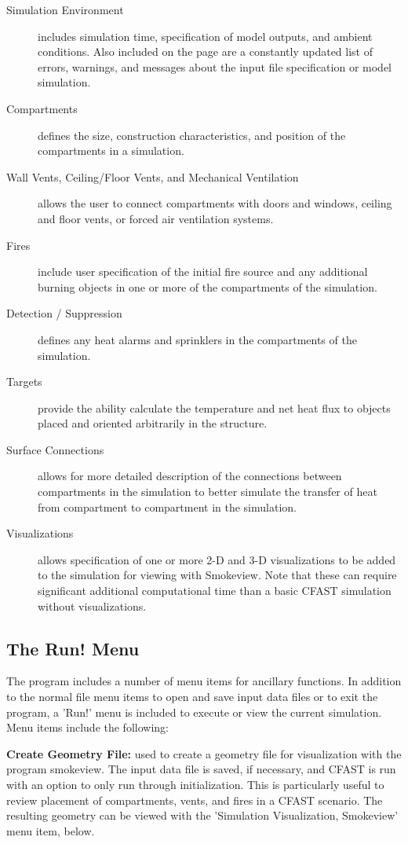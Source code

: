 \begin{description}
\item[Simulation Environment] includes simulation time, specification of model outputs, and ambient conditions. Also included on the page are a constantly updated list of errors, warnings, and messages about the input file specification or model simulation.
\item[Compartments] defines the size, construction characteristics, and position of the compartments in a simulation.
\item[Wall Vents, Ceiling/Floor Vents, and Mechanical Ventilation] allows the user to connect compartments with doors and windows, ceiling and floor vents, or forced air ventilation systems.
\item[Fires] include user specification of the initial fire source and any additional burning objects in one or more of the compartments of the simulation.
\item[Detection / Suppression] defines any heat alarms and sprinklers in the compartments of the simulation.
\item[Targets] provide the ability calculate the temperature and net heat flux to objects placed and oriented arbitrarily in the structure.
\item[Surface Connections] allows for more detailed description of the connections between compartments in the simulation to better simulate the transfer of heat from compartment to compartment in the simulation.
\item[Visualizations] allows specification of one or more 2-D and 3-D visualizations to be added to the simulation for viewing with Smokeview. Note that these can require significant additional computational time than a basic CFAST simulation without visualizations.
\end{description}


\subsection{The Run! Menu}

The program includes a number of menu items for ancillary functions.  In addition to the normal file menu items to open and save input data files or to exit the program, a 'Run!' menu is included to execute or view the current simulation. Menu items include the following:

\textbf{Create Geometry File:} used to create a geometry file for visualization with the program smokeview.  The input data file is saved, if necessary, and CFAST is run with an option to only run through initialization. This is particularly useful to review placement of compartments, vents, and fires in a CFAST scenario. The resulting geometry can be viewed with the 'Simulation Visualization, Smokeview' menu item, below.

